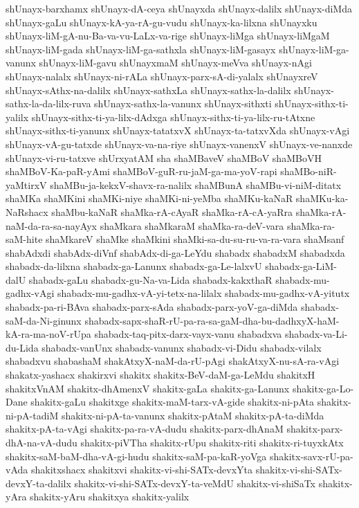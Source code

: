 {shUnayx-barxhamx
shUnayx-dA-ceya
shUnayxda
shUnayx-dalilx
shUnayx-diMda
shUnayx-gaLu
shUnayx-kA-ya-rA-gu-vudu
shUnayx-ka-lilxna
shUnayxku
shUnayx-liM-gA-nu-Ba-va-vu-LaLx-va-rige
shUnayx-liMga
shUnayx-liMgaM
shUnayx-liM-gada
shUnayx-liM-ga-sathxla
shUnayx-liM-gasayx
shUnayx-liM-ga-vanunx
shUnayx-liM-gavu
shUnayxmaM
shUnayx-meVva
shUnayx-nAgi
shUnayx-nalalx
shUnayx-ni-rALa
shUnayx-parx-sA-di-yalalx
shUnayxreV
shUnayx-sAthx-na-dalilx
shUnayx-sathxLa
shUnayx-sathx-la-dalilx
shUnayx-sathx-la-da-lilx-ruva
shUnayx-sathx-la-vanunx
shUnayx-sithxti
shUnayx-sithx-ti-yalilx
shUnayx-sithx-ti-ya-lilx-dAdxga
shUnayx-sithx-ti-ya-lilx-ru-tAtxne
shUnayx-sithx-ti-yanunx
shUnayx-tatatxvX
shUnayx-ta-tatxvXda
shUnayx-vAgi
shUnayx-vA-gu-tatxde
shUnayx-va-na-riye
shUnayx-vanenxV
shUnayx-ve-nanxde
shUnayx-vi-ru-tatxve
shUrxyatAM
sha
shaMBaveV
shaMBoV
shaMBoVH
shaMBoV-Ka-paR-yAmi
shaMBoV-guR-ru-jaM-ga-ma-yoV-rapi
shaMBo-niR-yaMtirxV
shaMBu-ja-kekxV-shavx-ra-nalilx
shaMBunA
shaMBu-vi-niM-ditatx
shaMKa
shaMKini
shaMKi-niye
shaMKi-ni-yeMba
shaMKu-kaNaR
shaMKu-ka-NaRshacx
shaMbu-kaNaR
shaMka-rA-cAyaR
shaMka-rA-cA-yaRra
shaMka-rA-naM-da-ra-sa-nayAyx
shaMkara
shaMkaraM
shaMka-ra-deV-vara
shaMka-ra-saM-hite
shaMkareV
shaMke
shaMkini
shaMki-sa-du-su-ru-va-ra-vara
shaMsanf
shabAdxdi
shabAdx-diVnf
shabAdx-di-ga-LeYdu
shabadx
shabadxM
shabadxda
shabadx-da-lilxna
shabadx-ga-Lanunx
shabadx-ga-Le-lalxvU
shabadx-ga-LiM-dalU
shabadx-gaLu
shabadx-gu-Na-va-Lida
shabadx-kakxthaR
shabadx-mu-gadhx-vAgi
shabadx-mu-gadhx-vA-yi-tetx-na-lilalx
shabadx-mu-gadhx-vA-yitutx
shabadx-pa-ri-BAva
shabadx-parx-sAda
shabadx-parx-yoV-ga-diMda
shabadx-saM-da-Ni-ginunx
shabadx-sapx-shaR-rU-pa-ra-sa-gaM-dha-bu-dadhxyX-haM-kA-ra-ma-noV-rUpa
shabadx-taq-pitx-darx-vayx-vanu
shabadxva
shabadx-va-Li-du-Lida
shabadx-vanUnx
shabadx-vanunx
shabadx-vi-Didu
shabadx-vilalx
shabadxvu
shabashaM
shakAtxyX-naM-da-rU-pAgi
shakAtxyX-nu-sA-ra-vAgi
shakatx-yashacx
shakirxvi
shakitx
shakitx-BeV-daM-ga-LeMdu
shakitxH
shakitxVnAM
shakitx-dhAmenxV
shakitx-gaLa
shakitx-ga-Lanunx
shakitx-ga-Lo-Dane
shakitx-gaLu
shakitxge
shakitx-maM-tarx-vA-gide
shakitx-ni-pAta
shakitx-ni-pA-tadiM
shakitx-ni-pA-ta-vanunx
shakitx-pAtaM
shakitx-pA-ta-diMda
shakitx-pA-ta-vAgi
shakitx-pa-ra-vA-dudu
shakitx-parx-dhAnaM
shakitx-parx-dhA-na-vA-dudu
shakitx-piVTha
shakitx-rUpu
shakitx-riti
shakitx-ri-tuyxkAtx
shakitx-saM-baM-dha-vA-gi-hudu
shakitx-saM-pa-kaR-yoVga
shakitx-savx-rU-pa-vAda
shakitxshacx
shakitxvi
shakitx-vi-shi-SATx-devxYta
shakitx-vi-shi-SATx-devxY-ta-dalilx
shakitx-vi-shi-SATx-devxY-ta-veMdU
shakitx-vi-shiSaTx
shakitx-yAra
shakitx-yAru
shakitxya
shakitx-yalilx
}
